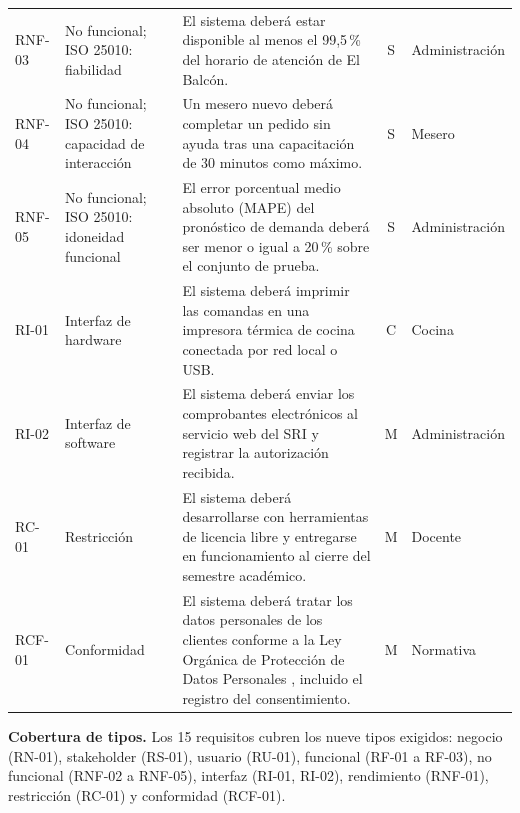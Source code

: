 \begin{longtable}{@{}>{\raggedright\arraybackslash}p{1.35cm}>{\raggedright\arraybackslash}p{2.7cm}>{\raggedright\arraybackslash}p{6.3cm}c>{\raggedright\arraybackslash}p{2.2cm}@{}}
RNF-03 & No funcional; ISO 25010: fiabilidad & El sistema deber\'a estar disponible al menos el 99,5\,\% del horario de atenci\'on de El Balc\'on. & S & Administraci\'on \\
RNF-04 & No funcional; ISO 25010: capacidad de interacci\'on & Un mesero nuevo deber\'a completar un pedido sin ayuda tras una capacitaci\'on de 30 minutos como m\'aximo. & S & Mesero \\
RNF-05 & No funcional; ISO 25010: idoneidad funcional & El error porcentual medio absoluto (MAPE) del pron\'ostico de demanda deber\'a ser menor o igual a 20\,\% sobre el conjunto de prueba. & S & Administraci\'on \\
RI-01 & Interfaz de hardware & El sistema deber\'a imprimir las comandas en una impresora t\'ermica de cocina conectada por red local o USB. & C & Cocina \\
RI-02 & Interfaz de software & El sistema deber\'a enviar los comprobantes electr\'onicos al servicio web del SRI \cite{sriFE} y registrar la autorizaci\'on recibida. & M & Administraci\'on \\
RC-01 & Restricci\'on & El sistema deber\'a desarrollarse con herramientas de licencia libre y entregarse en funcionamiento al cierre del semestre acad\'emico. & M & Docente \\
RCF-01 & Conformidad & El sistema deber\'a tratar los datos personales de los clientes conforme a la Ley Org\'anica de Protecci\'on de Datos Personales \cite{lopdp2021}, incluido el registro del consentimiento. & M & Normativa \\
\end{longtable}
\normalsize

\textbf{Cobertura de tipos.} Los 15 requisitos cubren los nueve tipos exigidos: negocio (RN-01), stakeholder (RS-01), usuario (RU-01), funcional (RF-01 a RF-03), no funcional (RNF-02 a RNF-05), interfaz (RI-01, RI-02), rendimiento (RNF-01), restricci\'on (RC-01) y conformidad (RCF-01).
